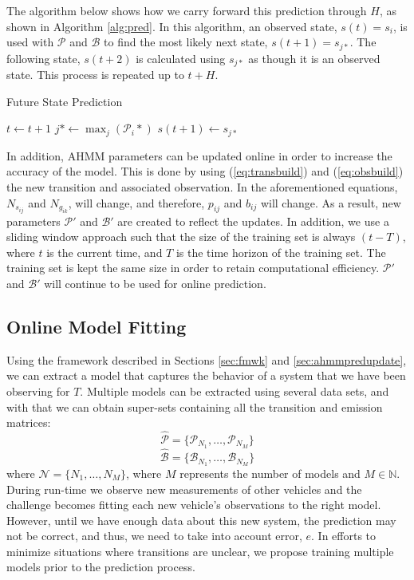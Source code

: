 \documentclass[letterpaper, 10 pt, conference]{ieeeconf}  %
\newcommand\NB[1]{$\spadesuit$\footnote{NB: #1}}
\begin{document}
The algorithm below shows how we carry forward this prediction through $H$, as shown in Algorithm \ref{alg:pred}. In this algorithm, an observed state, $s(t) = s_i$, is used with $\mathcal P$ and $\mathcal B$ to find the most likely next state, $s(t+1) = s_{j*}$. The following state, $s(t+2)$ is calculated using $s_{j*}$ as though it is an observed state. This process is repeated up to $t+H$. 

\begin{algorithm}[ht!]
\caption{Future State Prediction} \label{alg:pred}
\begin{algorithmic}[1]
\STATE $t \gets t+1$
\STATE $j* \gets \max_j(\mathcal{P}_{i}*)$
\ENDFOR
\STATE $s(t+1) \gets s_{j*}$
\ENDWHILE
\end{algorithmic}
\end{algorithm}

In addition, AHMM parameters can be updated online in order to increase the accuracy of the model. This is done by using (\ref{eq:transbuild}) and (\ref{eq:obsbuild}) the new transition and associated observation. In the aforementioned equations, $N_{s_{ij}}$ and $N_{g_{ik}}$, will change, and therefore, $p_{ij}$ and $b_{ij}$ will change. As a result, new parameters $\mathcal{P'}$ and $\mathcal{B'}$ are created to reflect the updates. In addition, we use a sliding window approach such that the size of the training set is always $(t-T)$, where $t$ is the current time, and $T$ is the time horizon of the training set. The training set is kept the same size in order to retain computational efficiency. $\mathcal{P'}$ and $\mathcal{B'}$ will continue to be used for online prediction. %

\subsection{Online Model Fitting}\label{sec:omf} %
Using the framework described in Sections \ref{sec:fmwk} and \ref{sec:ahmmpredupdate},  we can extract a model that captures the behavior of a system that we have been observing for $T$. Multiple models can be extracted using several data sets, and with that we can obtain super-sets containing all the transition and emission matrices: 
\begin{equation}
    \hat{\mathcal{P}} = \{\mathcal{P}_{N_{1}},\ldots,\mathcal{P}_{N_{M}}\}
\end{equation}
\begin{equation}
    \hat{\mathcal{B}} = \{\mathcal{B}_{N_{1}},\ldots,\mathcal{B}_{N_{M}}\}
\end{equation}
where $\mathcal{N} = \{N_1,\ldots,N_M\}$, where $M$ represents the number of models and $M\in\mathbb{N}$.
During run-time we observe new measurements of other vehicles and the challenge becomes fitting each new vehicle's observations to the right model. However, until we have enough data about this new system, the prediction may not be correct, and thus, we need to take into account error, $e$. In efforts to minimize situations where transitions are unclear, we propose training multiple models prior to the prediction process.
\end{document}
